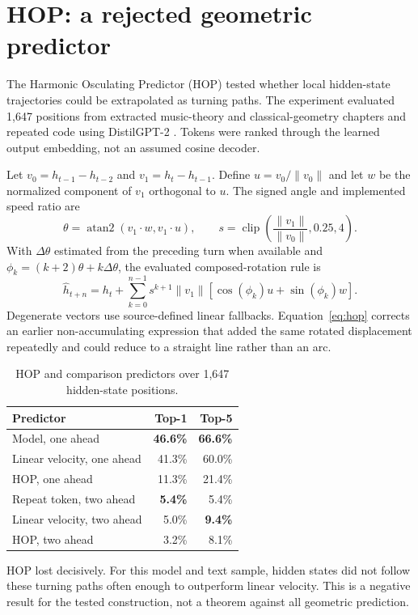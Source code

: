 \section{HOP: a rejected geometric predictor}
The Harmonic Osculating Predictor (HOP) tested whether local hidden-state trajectories could be extrapolated as turning paths. The experiment evaluated 1,647 positions from extracted music-theory and classical-geometry chapters and repeated code using DistilGPT-2 \cite{distilgpt2}. Tokens were ranked through the learned output embedding, not an assumed cosine decoder.

Let $v_0=h_{t-1}-h_{t-2}$ and $v_1=h_t-h_{t-1}$. Define $u=v_0/\lVert v_0\rVert$ and let $w$ be the normalized component of $v_1$ orthogonal to $u$. The signed angle and implemented speed ratio are
\begin{equation}
\theta=\operatorname{atan2}(v_1\cdot w,v_1\cdot u),\qquad
s=\operatorname{clip}\!\left(\frac{\lVert v_1\rVert}{\lVert v_0\rVert},0.25,4\right).
\end{equation}
With $\Delta\theta$ estimated from the preceding turn when available and
$\phi_k=(k+2)\theta+k\Delta\theta$, the evaluated composed-rotation rule is
\begin{equation}
\hat h_{t+n}=h_t+\sum_{k=0}^{n-1}s^{k+1}\lVert v_1\rVert
\left[\cos(\phi_k)u+\sin(\phi_k)w\right].
\label{eq:hop}
\end{equation}
Degenerate vectors use source-defined linear fallbacks. Equation~\eqref{eq:hop} corrects an earlier non-accumulating expression that added the same rotated displacement repeatedly and could reduce to a straight line rather than an arc.
\begin{table}[htbp]
\centering
\caption{HOP and comparison predictors over 1,647 hidden-state positions.}
\label{tab:hop}
\begin{tabular}{lrr}
\toprule
Predictor&Top-1&Top-5\\
\midrule
Model, one ahead&\textbf{46.6\%}&\textbf{66.6\%}\\
Linear velocity, one ahead&41.3\%&60.0\%\\
HOP, one ahead&11.3\%&21.4\%\\
Repeat token, two ahead&\textbf{5.4\%}&5.4\%\\
Linear velocity, two ahead&5.0\%&\textbf{9.4\%}\\
HOP, two ahead&3.2\%&8.1\%\\
\bottomrule
\end{tabular}
\end{table}
HOP lost decisively. For this model and text sample, hidden states did not follow these turning paths often enough to outperform linear velocity. This is a negative result for the tested construction, not a theorem against all geometric prediction.

